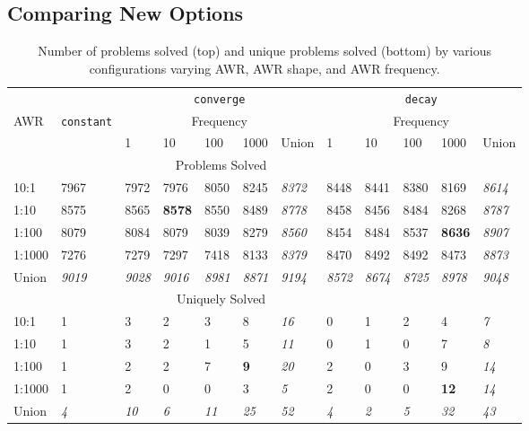 \documentclass{llncs}
\begin{document}
\subsection{Comparing New Options}


\begin{table}[t]
\caption{Number of problems solved (top) and unique problems solved (bottom) by various configurations varying AWR, AWR shape, and AWR frequency.\label{tab:short:runs}}
\centering
\begin{tabular}{l|l|lllll|lllll}
	& & \multicolumn{5}{|c}{\texttt{converge}} & \multicolumn{5}{|c}{\texttt{decay}}\\  
AWR & \texttt{constant} & \multicolumn{5}{|c|}{Frequency} & \multicolumn{5}{|c}{Frequency}\\  
&& 1 & 10 & 100 & 1000 & Union & 1 & 10 & 100 & 1000 & Union\\
\hline
\multicolumn{10}{c}{Problems Solved} \\ \hline
10:1		& 7967 & 7972 & 7976 & 8050 & 8245 & \emph{8372} & 8448 & 8441 & 8380 & 8169 & \emph{8614}\\
1:10		& 8575 & 8565 & \textbf{8578} & 8550 & 8489 & \emph{8778} & 8458 & 8456 & 8484 & 8268 & \emph{8787}\\
1:100	        & 8079 & 8084 & 8079 & 8039 & 8279 & \emph{8560} & 8454 & 8484 & 8537 & \textbf{8636} & \emph{8907}\\
1:1000     	& 7276 & 7279 & 7297 & 7418 & 8133 & \emph{8379} & 8470 & 8492 & 8492 & 8473 & \emph{8873}\\
\hline
Union           & \emph{9019} & \emph{9028} & \emph{9016} & \emph{8981} & \emph{8871} & \emph{9194} & \emph{8572} & \emph{8674} & \emph{8725} & \emph{8978} & \emph{9048}\\
\hline
\hline
\multicolumn{10}{c}{Uniquely Solved} \\ \hline
10:1		& 1 & 3 & 2 & 3 & 8 & \emph{16} & 0 & 1 & 2 & 4 & \emph{7}\\
1:10		& 1 & 3 & 2 & 1 & 5 & \emph{11} & 0 & 1 & 0 & 7 & \emph{8}\\
1:100	        & 1 & 2 & 2 & 7 & \textbf{9} & \emph{20} & 2 & 0 & 3 & 9 & \emph{14}\\
1:1000	        & 1 & 2 & 0 & 0 & 3 & \emph{5} & 2 & 0 & 0 & \textbf{12} & \emph{14}\\
\hline
Union           & \emph{4} & \emph{10} & \emph{6} & \emph{11} & \emph{25} & \emph{52} & \emph{4} & \emph{2} & \emph{5} & \emph{32} & \emph{43}\\ 
\end{tabular}
\end{table}
\end{document}
